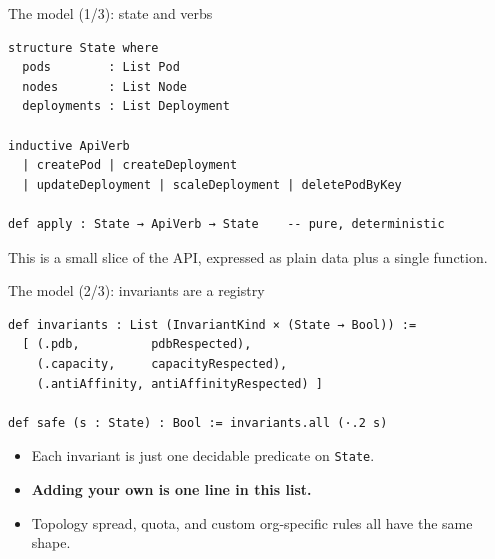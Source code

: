 \documentclass[10pt,aspectratio=169]{beamer}
\begin{document}
\begin{frame}[fragile]{The model (1/3): state and verbs}
\begin{lstlisting}
structure State where
  pods        : List Pod
  nodes       : List Node
  deployments : List Deployment

inductive ApiVerb
  | createPod | createDeployment
  | updateDeployment | scaleDeployment | deletePodByKey

def apply : State → ApiVerb → State    -- pure, deterministic
\end{lstlisting}
\vspace{0.4em}
\small
This is a small slice of the API, expressed as plain data plus a single function. 
\end{frame}

\begin{frame}[fragile]{The model (2/3): invariants are a registry}
\begin{lstlisting}
def invariants : List (InvariantKind × (State → Bool)) :=
  [ (.pdb,          pdbRespected),
    (.capacity,     capacityRespected),
    (.antiAffinity, antiAffinityRespected) ]

def safe (s : State) : Bool := invariants.all (·.2 s)
\end{lstlisting}
\vspace{0.4em}
\small
\begin{itemize}\itemsep0.2em
  \item Each invariant is just one decidable predicate on \texttt{State}.
  \item \textbf{Adding your own is one line in this list.}
  \item Topology spread, quota, and custom org-specific rules all have the same shape.
\end{itemize}
\end{frame}
\end{document}
